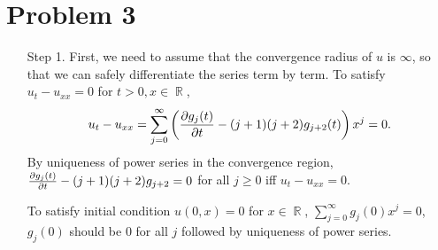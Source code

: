 \documentclass{article}
\DeclareMathOperator{\rr}{\mathbb{R}}
\begin{document}
\section*{Problem 3}
\begin{enumerate}
\item[Step 1.] First, we need to assume that the convergence radius of $u$ is $\infty$, so that we can safely differentiate the series term by term. To satisfy $u_t-u_{xx}=0$ for $t>0, x\in \rr$,
\begin{equation*}
u_t-u_{xx}=\sum_{j=0}^\infty \left(\pdv{g_j(t)}{t}-(j+1)(j+2)g_{j+2}(t)\right)x^{j}=0.
\end{equation*}
By uniqueness of power series in the convergence region, $\pdv{g_j(t)}{t}-(j+1)(j+2)g_{j+2}=0$ for all $j\geq 0$ iff $u_t-u_{xx}=0$.

To satisfy initial condition $u(0, x)=0$ for $x\in \rr$, $\sum_{j=0}^\infty g_j(0)x^j=0$, $g_j(0)$ should be $0$ for all $j$ followed by uniqueness of power series.


\end{enumerate}
\end{document}
